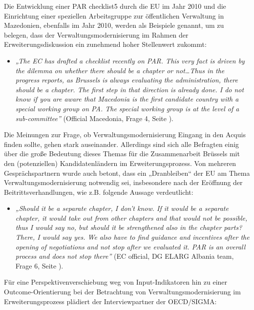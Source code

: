 Die Entwicklung einer PAR checklist5 durch die EU im Jahr 2010 und die Einrichtung einer speziellen Arbeitsgruppe zur öffentlichen Verwaltung in Mazedonien, ebenfalls im Jahr 2010, werden als Beispiele genannt, um zu belegen, dass der Verwaltungsmodernisierung im Rahmen der Erweiterungsdiskussion ein zunehmend hoher Stellenwert zukommt:

\begin{itemize}[label={}]
\item \textit{„The EC has drafted a checklist recently on PAR. This very fact is driven by the dilemma on whether there should be a chapter or not…Thus in the progress reports, as Brussels is always evaluating the administration, there should be a chapter. The first step in that direction is already done. I do not know if you are aware that Macedonia is the first candidate country with a special working group on PA. The special working group is at the level of a sub-committee”} (Official Macedonia, Frage 4, Seite \pageref{sec:par chapter}).
\end{itemize}

Die Meinungen zur Frage, ob Verwaltungsmodernisierung Eingang in den Acquis finden sollte, gehen stark auseinander. Allerdings sind sich alle Befragten einig über die große Bedeutung dieses Themas für die Zusammenarbeit Brüssels mit den (potenziellen) Kandidatenländern im Erweiterungsprozess. Von mehreren Gesprächspartnern wurde auch betont, dass ein „Dranbleiben“ der EU am Thema Verwaltungsmodernisierung notwendig sei, insbesondere nach der Eröffnung der Beitrittsverhandlungen, wie z.B. folgende Aussage verdeutlicht:

\begin{itemize}[label={}]
\item \textit{„Should it be a separate chapter, I don’t know. If it would be a separate chapter, it would take out from other chapters and that would not be possible, thus I would say no, but should it be strengthened also in the chapter parts? There, I would say yes. We also have to find guidance and incentives after the opening of negotiations and not stop after we evaluated it. PAR is an overall process and does not stop there”} (EC official, DG ELARG Albania team, Frage 6, Seite \pageref{sec:chapter}).
\end{itemize}

Für eine Perspektivenverschiebung weg von Input-Indikatoren hin zu einer Outcome-Orientierung bei der Betrachtung von Verwaltungsmodernisierung im Erweiterungsprozess plädiert der Interviewpartner der OECD/SIGMA:

